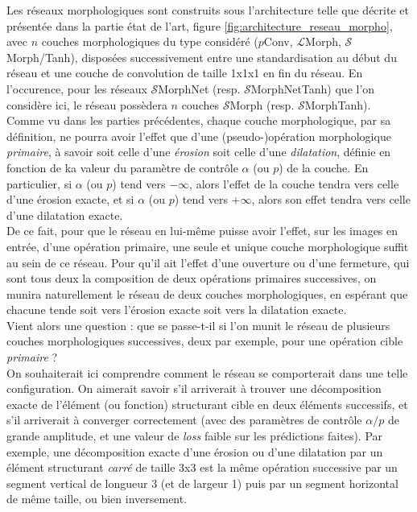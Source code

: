 Les réseaux morphologiques sont construits sous l'architecture telle que décrite et présentée dans la partie état de l'art, figure \ref{fig:architecture_reseau_morpho}, avec $n$ couches morphologiques du type considéré ($p$Conv, $\mathcal{L}$Morph, $\mathcal{S}$Morph/Tanh), disposées successivement entre une standardisation au début du réseau et une couche de convolution de taille 1x1x1 en fin du réseau. En l'occurence, pour les réseaux $\mathcal{S}$MorphNet (resp. $\mathcal{S}$MorphNetTanh) que l'on considère ici, le réseau possèdera $n$ couches $\mathcal{S}$Morph (resp. $\mathcal{S}$MorphTanh). \\

\vspace{-1.2mm}
\noindent Comme vu dans les parties précédentes, chaque couche morphologique, par sa définition, ne pourra avoir l'effet que d'une (pseudo-)opération morphologique \textit{primaire}, à savoir soit celle d'une \textit{érosion} soit celle d'une \textit{dilatation}, définie en fonction de ka valeur du paramètre de contrôle $\alpha$ (ou $p$) de la couche. En particulier, si $\alpha$ (ou $p$) tend vers $- \infty$, alors l'effet de la couche tendra vers celle d'une érosion exacte, et si $\alpha$ (ou $p$) tend vers $+ \infty$, alors son effet tendra vers celle d'une dilatation exacte. \\

\vspace{-1.2mm}
\noindent De ce fait, pour que le réseau en lui-même puisse avoir l'effet, sur les images en entrée, d'une opération primaire, une seule et unique couche morphologique suffit au sein de ce réseau. Pour qu'il ait l'effet d'une ouverture ou d'une fermeture, qui sont tous deux la composition de deux opérations primaires successives, on munira naturellement le réseau de deux couches morphologiques, en espérant que chacune tende soit vers l'érosion exacte soit vers la dilatation exacte. \\

\vspace{0.6mm}
\noindent Vient alors une question : que se passe-t-il si l'on munit le réseau de plusieurs couches morphologiques successives, deux par exemple, pour une opération cible \textit{primaire} ? \\

\vspace{1.0mm}
On souhaiterait ici comprendre comment le réseau se comporterait dans une telle configuration. On aimerait savoir s'il arriverait à trouver une décomposition exacte de l'élément (ou fonction) structurant cible en deux éléments successifs, et s'il arriverait à converger correctement (avec des paramètres de contrôle $\alpha / p$ de grande amplitude, et une valeur de \textit{loss} faible sur les prédictions faites). Par exemple, une décomposition exacte d'une érosion ou d'une dilatation par un élément structurant \textit{carré} de taille 3x3 est la même opération successive par un segment vertical de longueur 3 (et de largeur 1) puis par un segment horizontal de même taille, ou bien inversement. \\

